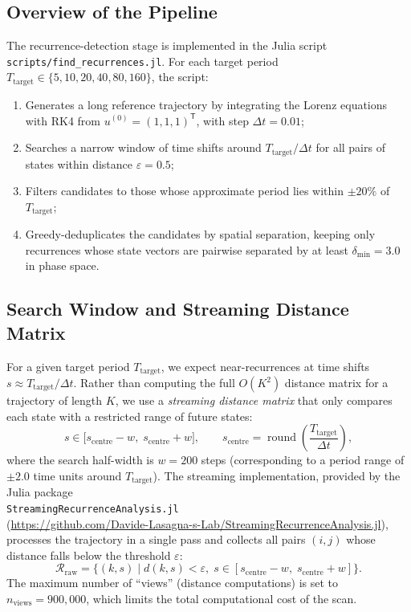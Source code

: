 \documentclass[11pt,a4paper]{article}
\begin{document}
\subsection{Overview of the Pipeline}
The recurrence-detection stage is implemented in the Julia script
\texttt{scripts/find\_recurrences.jl}.  For each target period
$T_{\text{target}} \in \{5, 10, 20, 40, 80, 160\}$, the script:
\begin{enumerate}[label=(\roman*)]
  \item Generates a long reference trajectory by integrating the Lorenz
        equations with RK4 from $u^{(0)} = (1,1,1)^{\mathsf{T}}$,
        with step $\Delta t = 0.01$;
  \item Searches a narrow window of time shifts around
        $T_{\text{target}} / \Delta t$ for all pairs of states within
        distance $\varepsilon = 0.5$;
  \item Filters candidates to those whose approximate period lies within
        $\pm 20\%$ of $T_{\text{target}}$;
  \item Greedy-deduplicates the candidates by spatial separation, keeping
        only recurrences whose state vectors are pairwise separated by at
        least $\delta_{\min} = 3.0$ in phase space.
\end{enumerate}

\subsection{Search Window and Streaming Distance Matrix}
For a given target period $T_{\text{target}}$, we expect near-recurrences at
time shifts $s \approx T_{\text{target}} / \Delta t$.  Rather than computing
the full $O(K^2)$ distance matrix for a trajectory of length $K$, we use a
\emph{streaming distance matrix} that only compares each state with a
restricted range of future states:
\begin{equation}
  s \in \bigl[s_{\text{centre}} - w,\; s_{\text{centre}} + w\bigr],
  \qquad s_{\text{centre}} = \operatorname{round}\!\left(\frac{T_{\text{target}}}{\Delta t}\right),
\end{equation}
where the search half-width is $w = 200$ steps (corresponding to a period
range of $\pm 2.0$ time units around $T_{\text{target}}$).  The streaming
implementation, provided by the Julia package\\
\texttt{StreamingRecurrenceAnalysis.jl}\\
(\url{https://github.com/Davide-Lasagna-s-Lab/StreamingRecurrenceAnalysis.jl}),
processes the trajectory in a single
pass and collects all pairs $(i, j)$ whose distance falls below the threshold
$\varepsilon$:
\begin{equation}\label{eq:streaming}
  \mathcal{R}_{\text{raw}}
  = \bigl\{ (k, s) \;\big|\;
           d(k, s) < \varepsilon,\;
           s \in [s_{\text{centre}} - w,\; s_{\text{centre}} + w]
    \bigr\}.
\end{equation}
The maximum number of ``views'' (distance computations) is set to
$n_{\text{views}} = 900,\!000$, which limits the total computational cost of
the scan.
\end{document}
